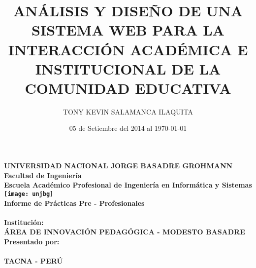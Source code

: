 \title{ANÁLISIS Y DISEÑO DE UNA SISTEMA WEB PARA LA INTERACCIÓN ACADÉMICA E INSTITUCIONAL DE LA COMUNIDAD EDUCATIVA}
\author{TONY KEVIN SALAMANCA ILAQUITA}
\date{05 de Setiembre del 2014 al \today}


\newcommand{\univname}{UNIVERSIDAD NACIONAL JORGE BASADRE GROHMANN}

\newcommand{\deptname}{Facultad de Ingeniería}

\newcommand{\college}{Escuela Académico Profesional de Ingeniería en Informática y Sistemas}

\newcommand{\subjectname}{Informe de Prácticas Pre - Profesionales}

\newcommand{\institutionname}{ÁREA DE INNOVACIÓN PEDAGÓGICA - MODESTO BASADRE}

\newcommand{\institutionaddress}{TACNA - PERÚ}




\begin{titlepage}

\begin{center}
\textbf{
\univname\\
\vspace{.5cm}
\deptname\\
\vspace{1cm}
\college\\
\vspace{.5cm}
\texttt{[image: unjbg]}\\
\vspace{.5cm}
\subjectname\\
\vspace{.5cm}
\thetitle\\
\vspace{1cm}
Institución:\\
\vspace{.3cm}
\institutionname\\
\vspace{1cm}
Presentado por:\\
\vspace{.3cm}
\theauthor\\
\vspace{1cm}
\thedate
\vfill
\institutionaddress\\
\vspace{.3cm}
\the\year}

\end{center}
\end{titlepage}

\restoregeometry
